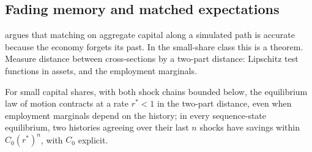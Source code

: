 \subsection{Fading memory and matched expectations}

\citet{lee2026} argues that matching on aggregate capital along a simulated path is accurate because
the economy forgets its past. In the small-share class this is a theorem. Measure distance between
cross-sections by a two-part distance: Lipschitz test functions in assets, and the employment
marginals.

\begin{theorem}\label{thm:matching}
For small capital shares, with both shock chains bounded below, the equilibrium law of motion
contracts at a rate $r^*<1$ in the two-part distance, even when employment marginals depend on the
history; in every sequence-state equilibrium, two histories agreeing over their last $n$ shocks have
savings within $C_0(r^*)^n$, with $C_0$ explicit.
\end{theorem}
